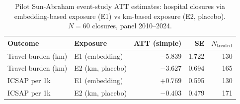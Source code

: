 \begin{table}[h!]
\centering
\caption{Pilot Sun-Abraham event-study ATT estimates: hospital closures via embedding-based exposure (E1) vs km-based exposure (E2, placebo). $N=60$ closures, panel 2010--2024.}
\label{tab:es-pilot}
\small
\begin{tabular}{llrrr}
\toprule
Outcome & Exposure & ATT (simple) & SE & $N_{\text{treated}}$ \\
\midrule
Travel burden (km) & E1 (embedding) & $-5.839$ & 1.722 & 130 \\
Travel burden (km) & E2 (km, placebo) & $-3.627$ & 0.694 & 165 \\
ICSAP per 1k & E1 (embedding) & $+0.769$ & 0.595 & 130 \\
ICSAP per 1k & E2 (km, placebo) & $-0.403$ & 0.479 & 171 \\
\bottomrule
\end{tabular}
\end{table}
